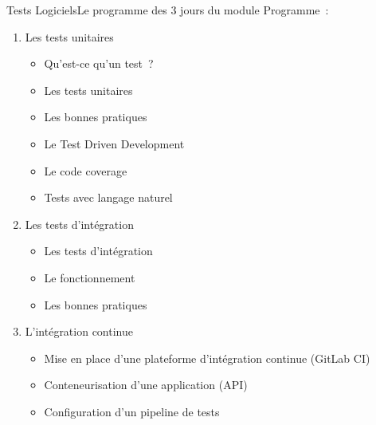 \documentclass{beamer}
\begin{document}
    \begin{frame}{Tests Logiciels}{Le programme des 3 jours du module}
        \transdissolve
        Programme~:
        \begin{enumerate}
            \item Les tests unitaires
            \begin{itemize}
                \item Qu’est-ce qu’un test~?
                \item Les tests unitaires
                \item Les bonnes pratiques
                \item Le Test Driven Development
                \item Le code coverage
                \item Tests avec langage naturel
            \end{itemize}
            \item  Les tests d’intégration
            \begin{itemize}
                \item  Les tests d’intégration
                \item  Le fonctionnement
                \item  Les bonnes pratiques
            \end{itemize}
            \item L’intégration continue
            \begin{itemize}
                \item  Mise en place d’une plateforme d’intégration continue (GitLab CI)
                \item  Conteneurisation d’une application (API)
                \item  Configuration d’un pipeline de tests
            \end{itemize}
        \end{enumerate}
    \end{frame}
\end{document}

